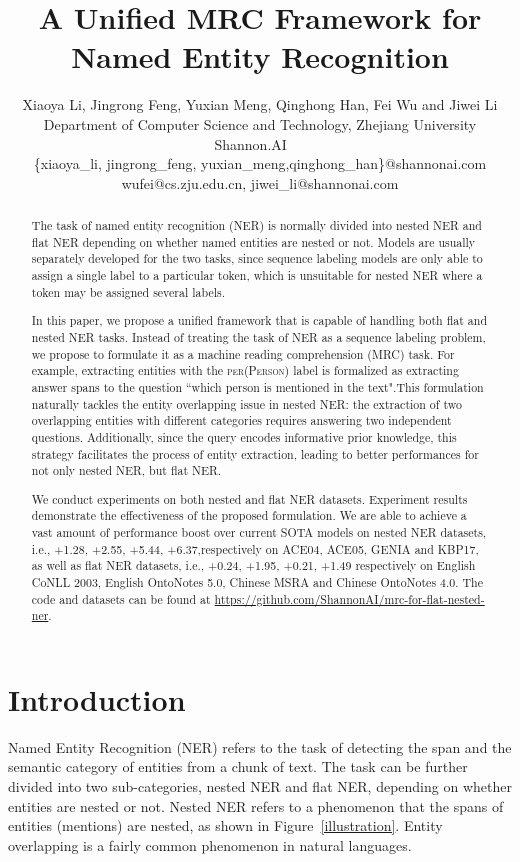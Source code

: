\documentclass[11pt,a4paper]{article}
\title{A Unified MRC Framework for Named Entity Recognition}
\author{Xiaoya Li, Jingrong Feng, Yuxian Meng, Qinghong Han, Fei Wu and Jiwei Li  \\
 Department of Computer Science and Technology, Zhejiang University\\
 Shannon.AI  ~~\\
  \{xiaoya\_li, jingrong\_feng, yuxian\_meng,qinghong\_han\}@shannonai.com\\
   wufei@cs.zju.edu.cn,  jiwei\_li@shannonai.com
}
\date{}
\begin{document}
\maketitle

\begin{abstract}
The task of named entity recognition (NER)  is normally divided into nested NER and flat NER depending  on whether named entities are nested or not. Models are usually separately developed for the two tasks, since   sequence labeling models are only able to assign a single label to a particular token, which is unsuitable for nested NER where a token may be assigned several labels.

In this paper, we propose a unified framework  that is capable of handling both flat and nested NER tasks. Instead of treating the task of NER as a sequence labeling problem, we propose to formulate it as a machine reading comprehension (MRC) task. For example, extracting entities with the \textsc{per(Person)} label is formalized as extracting answer spans to the question  ``which person is mentioned in the text".This formulation naturally  tackles the entity overlapping issue in nested NER: the extraction of two overlapping entities with different categories requires answering two independent questions. Additionally, since the query encodes informative prior knowledge, this strategy facilitates the process of entity extraction, leading to better performances for not only nested NER, but flat NER. 
 

We conduct experiments on both nested and flat NER datasets. Experiment results demonstrate  the effectiveness of the proposed formulation. We are able to achieve a vast amount of performance boost over current SOTA models on nested NER datasets, i.e.,   +1.28, +2.55, +5.44, +6.37,respectively on ACE04, ACE05, GENIA and KBP17, as well as flat NER datasets, i.e., +0.24, +1.95, +0.21, +1.49 respectively on English CoNLL 2003, English OntoNotes 5.0, Chinese MSRA and Chinese OntoNotes 4.0. The code and datasets can be found at \url{ https://github.com/ShannonAI/mrc-for-flat-nested-ner}.



\end{abstract}

\section{Introduction}



Named Entity Recognition (NER)  refers to the task of detecting the span and the semantic category of entities from a chunk of text.
The task can be further divided into two sub-categories, nested NER and flat NER,  
depending  on whether entities are nested or not. 
Nested NER refers to a phenomenon that the spans of entities (mentions) are nested, 
as shown in Figure~\ref{illustration}. Entity overlapping is a fairly common phenomenon in natural languages.   
\end{document}
